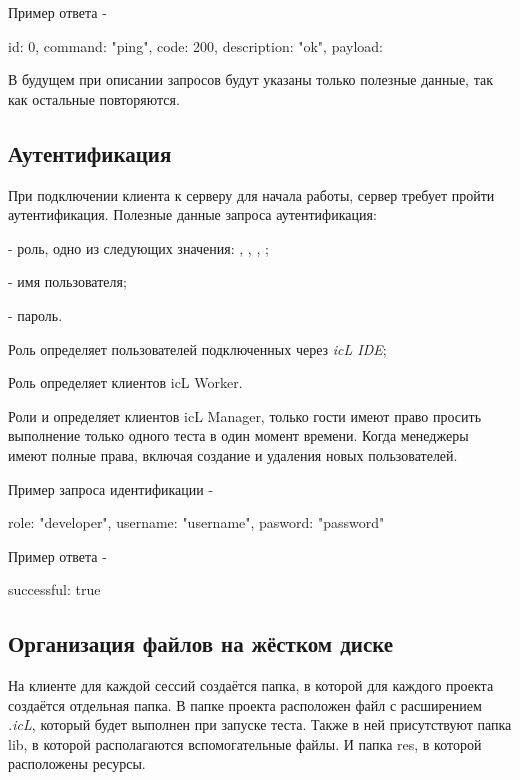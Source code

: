 Пример ответа -
\begin{jscode}
{
	id: 0,
	command: "ping",
	code: 200,
	description: "ok",
	payload: {}
}
\end{jscode}

В будущем при описании запросов будут указаны только полезные данные, так как остальные повторяются.

\subsection{Аутентификация}

При подключении клиента к серверу для начала работы, сервер требует пройти аутентификация. Полезные данные запроса аутентификация:
\begin{icItems}
	\item {} - роль, одно из следующих значения: , , , ;
	\item {} - имя пользователя;
	\item {} - пароль.
\end{icItems}

Роль  определяет пользователей подключенных через {\it icL IDE};

Роль  определяет клиентов icL Worker.

Роли  и  определяет клиентов icL Manager, только гости имеют право просить выполнение только одного теста в один момент времени. Когда менеджеры имеют полные права, включая создание и удаления новых пользователей.

Пример запроса идентификации -
\begin{jscode}
{
	role: "developer",
	username: "username",
	pasword: "password"
}
\end{jscode}

Пример ответа -
\begin{jscode}
{ 
	successful: true 
}
\end{jscode}

\subsection{Организация файлов на жёстком диске}

На клиенте для каждой сессий создаётся папка, в которой для каждого проекта создаётся отдельная папка. В папке проекта расположен файл с расширением {\it .icL}, который будет выполнен при запуске теста. Также в ней присутствуют папка lib, в которой располагаются вспомогательные файлы. И папка res, в которой расположены ресурсы.

